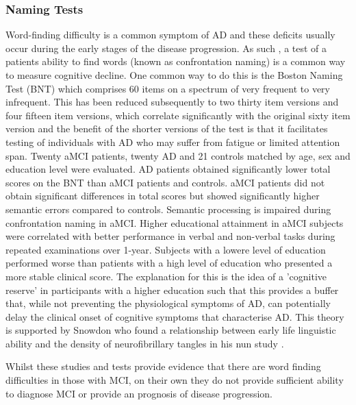 \documentclass[12pt, twoside, a4paper]{article}
\begin{document}
\subsubsection{Naming Tests}
Word-finding difficulty is a common symptom of AD and these deficits usually occur during the early stages of the disease progression. As such , a test of a patients ability to find words (known as confrontation naming) is a common way to measure cognitive decline. One common way to do this is the Boston Naming Test (BNT) which comprises 60 items on a spectrum of very frequent to very infrequent. This has been reduced subsequently to two thirty item versions and four fifteen item versions, which correlate significantly with the original sixty item version and the benefit of the shorter versions of the test is that it facilitates testing of individuals with AD who may suffer from fatigue or limited attention span. 
Twenty aMCI patients, twenty AD and 21 controls matched by age, sex and education level were evaluated. AD patients obtained significantly lower total scores on the BNT than aMCI patients and controls. aMCI patients did not obtain significant differences in total scores but showed significantly higher semantic errors compared to controls. Semantic processing is impaired during confrontation naming in aMCI.
Higher educational attainment in aMCI subjects were correlated with better performance in verbal and non-verbal tasks during repeated examinations over 1-year. Subjects with a lowere level of education performed worse than patients with a high level of education who presented a more stable clinical score. The explanation for this is the idea of a 'cognitive reserve' in participants with a higher education such that this provides a buffer that, while not preventing the physiological symptoms of AD, can potentially delay the clinical onset of cognitive symptoms that characterise AD. This theory is supported by Snowdon who found a relationship between early life linguistic ability and the density of neurofibrillary tangles in his nun study \cite{Snowdon1996}.

Whilst these studies and tests provide evidence that there are word finding difficulties in those with MCI, on their own they do not provide sufficient ability to diagnose MCI or provide an prognosis of disease progression.
\end{document}
